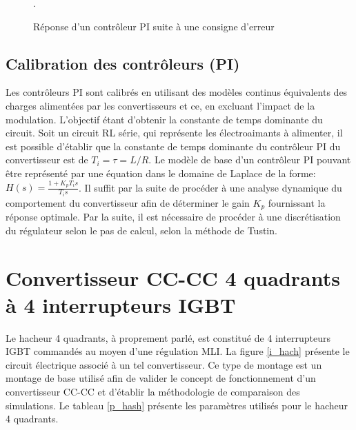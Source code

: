 \begin{figure}[htb]
\caption{Réponse d'un contrôleur PI suite à une consigne d'erreur}.
\label{PI}
\end{figure}

\clearpage
\subsection{Calibration des contrôleurs (PI)}
Les contrôleurs PI sont calibrés en utilisant des modèles continus équivalents des charges alimentées par les convertisseurs et ce, en excluant l'impact de la modulation. L'objectif étant d'obtenir la constante de temps dominante du circuit. Soit un circuit RL série, qui représente les électroaimants à alimenter, il est possible d'établir que la constante de temps dominante du contrôleur PI du convertisseur est de $T_i = \tau = L/R$. Le modèle de base d'un contrôleur PI pouvant être représenté par une équation dans le domaine de Laplace de la forme: $H(s) = \frac{1 + K_p T_is}{T_i s}$. Il suffit par la suite de procéder à une analyse dynamique du comportement du convertisseur afin de déterminer le gain $K_p$ fournissant la réponse optimale. Par la suite, il est nécessaire de procéder à une discrétisation du régulateur selon le pas de calcul, selon la méthode de Tustin. 
\section{Convertisseur CC-CC 4 quadrants à 4 interrupteurs IGBT}
Le hacheur 4 quadrants, à proprement parlé, est constitué de 4 interrupteurs IGBT commandés au moyen d'une régulation MLI. La figure \ref{i_hach} présente le circuit électrique associé à un tel convertisseur. Ce type de montage est un montage de base utilisé afin de valider le concept de fonctionnement d'un convertisseur CC-CC et d'établir la méthodologie de comparaison des simulations. Le tableau \ref{p_hash} présente les paramètres utilisés pour le hacheur 4 quadrants.

